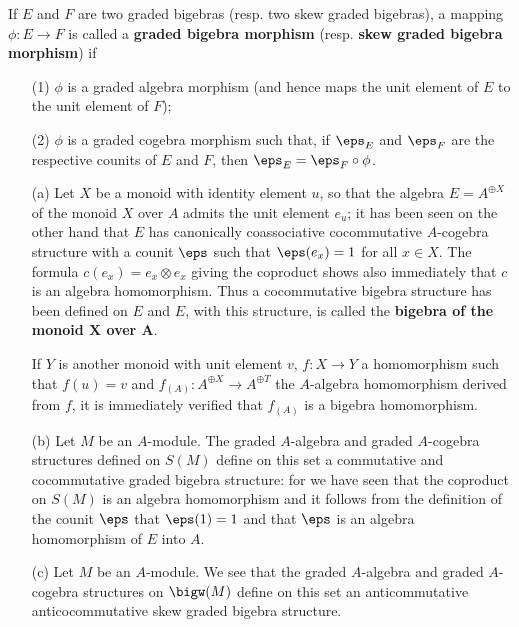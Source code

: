 If $E$ and $F$ are two graded bigebras (resp. two skew graded bigebras), a mapping $\phi:E\to F$ is called a \textbf{graded bigebra morphism} (resp. \textbf{skew graded bigebra morphism}) if
\begin{itemize}
\item[(1)] $\phi$ is a graded algebra morphism (and hence maps the unit element of $E$ to the unit element of $F$);
\item[(2)] $\phi$ is a graded cogebra morphism such that, if $\eps_E$ and $\eps_F$ are the respective counits of $E$ and $F$, then $\eps_E=\eps_F\circ\phi$.
\end{itemize}
\begin{example}\label{bigebra example}
\mbox{}
\begin{itemize}
\item[(a)] Let $X$ be a monoid with identity element $u$, so that the algebra $E=A^{\oplus X}$ of the monoid $X$ over $A$ admits the unit element $e_u$; it has been seen on the other hand that $E$ has canonically coassociative cocommutative $A$-cogebra structure with a counit $\eps$ such that $\eps(e_x)=1$ for all $x\in X$. The formula $c(e_x)=e_x\otimes e_x$ giving the coproduct shows also immediately that $c$ is an algebra homomorphism. Thus a cocommutative bigebra structure has been defined on $E$ and $E$, with this structure, is called the \textbf{bigebra of the monoid $\bm{X}$ over $\bm{A}$}.\par
If $Y$ is another monoid with unit element $v$, $f:X\to Y$ a homomorphism such that $f(u)=v$ and $f_{(A)}:A^{\oplus X}\to A^{\oplus T}$ the $A$-algebra homomorphism derived from $f$, it is immediately verified that $f_{(A)}$ is a bigebra homomorphism.
\item[(b)] Let $M$ be an $A$-module. The graded $A$-algebra and graded $A$-cogebra structures defined on $S(M)$ define on this set a commutative and cocommutative graded bigebra structure: for we have seen that the coproduct on $S(M)$ is an algebra homomorphism and it follows from the definition of the counit $\eps$ that $\eps(1)=1$ and that $\eps$ is an algebra homomorphism of $E$ into $A$.
\item[(c)] Let $M$ be an $A$-module. We see that the graded $A$-algebra and graded $A$-cogebra structures on $\bigw(M)$ define on this set an anticommutative anticocommutative skew graded bigebra structure.
\end{itemize}
\end{example}
